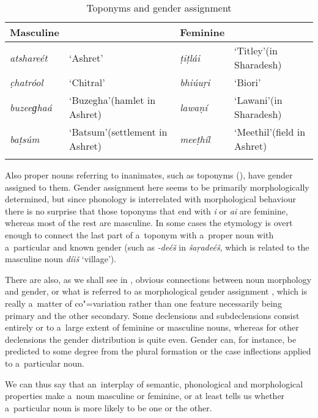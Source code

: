 \begin{table}[ht]
\caption{Toponyms and gender assignment}
\begin{tabularx}{\textwidth}{ l Q l Q }
\lsptoprule
Masculine &
&
Feminine &
\\\hline
\textit{atshareét} &
`Ashret' &
\textit{ṭiṭlái} &
`Titley'\newline (in Sharadesh)\\
\textit{c̣hatróol} &
`Chitral' &
\textit{bhiúuṛi} &
`Biori'\\
\textit{buzeeɡhaá} &
`Buzegha'\newline (hamlet in Ashret) &
\textit{lawaṇí} &
`Lawani'\newline (in Sharadesh)\\
\textit{baṭsúm} &
`Batsum'\newline (settlement in Ashret) &
\textit{meeṭhíl} &
`Meethil'\newline (field in Ashret)\\\lspbottomrule
\end{tabularx}
\label{tab:4-3}
\end{table}


Also proper nouns referring to inanimates, such as toponyms (), have gender assigned to them. Gender assignment here seems to be primarily morphologically determined, but since phonology is interrelated with morphological behaviour there is no surprise that those toponyms that end with \textit{i} or \textit{ai} are feminine, whereas most of the rest are masculine. In some cases the etymology is overt enough to connect the last part of a~toponym with a~proper noun with a~particular and known gender (such as \textit{-deéš} in \textit{šaṛadeéš}, which is related to the masculine noun \textit{díiš} `village').


There are also, as we shall see in , obvious connections between noun morphology and gender, or what is referred to as morphological gender assignment \citep[34--50]{corbett1991}, which is really a~matter of co"=variation rather than one feature necessarily being primary and the other secondary. Some declensions and subdeclensions consist entirely or to a~large extent of feminine or masculine nouns, whereas for other declensions the gender distribution is quite even. Gender can, for instance, be predicted to some degree from the plural formation or the case inflections applied to a~particular noun.


We can thus say that an~interplay of semantic, phonological and morphological properties make a~noun masculine or feminine, or at least tells us whether a~particular noun is more likely to be one or the other. 


